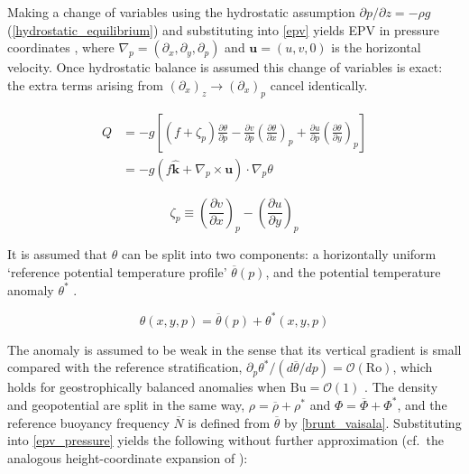 \documentclass{article}
\begin{document}
Making a change of variables using the hydrostatic assumption $\partial p /\partial z = - \rho g$ (\cref{hydrostatic_equilibrium}) and substituting into \cref{epv} yields EPV in pressure coordinates \cite{Hoskins1985}, where $\nabla _p = (\partial_x, \partial_y, \partial_p)$ and $\bm{u} = (u, v, 0)$ is the horizontal velocity.
Once hydrostatic balance is assumed this change of variables is exact: the extra terms arising from $(\partial_x)_z \to (\partial_x)_p$ \cite{Vallis2017} cancel identically.

\begin{equation}\label{epv_pressure}
\begin{aligned}
    Q &= -g \left[ \left(f + \zeta_p\right)\frac{\partial \theta}{\partial p} - \frac{\partial v}{\partial p} \left(\frac{\partial \theta}{\partial x}\right)_p + \frac{\partial u}{\partial p} \left(\frac{\partial \theta}{\partial y}\right)_p\right] \\
    &= -g (f \bm{\hat k} + \nabla_p \times \bm{u} ) \cdot \nabla_p \theta
\end{aligned}
\end{equation}

\begin{equation}\label{zeta_p}
    \zeta_p \equiv\left(\frac{\partial v}{\partial x}\right)_p - \left(\frac{\partial u}{\partial y}\right)_p
\end{equation}

It is assumed that $\theta$ can be split into two components: a horizontally uniform `reference potential temperature profile' $\overline \theta(p)$, and the potential temperature anomaly $\theta^*$ \cite{Hoskins1985,HOLTON_chapter6}.

\begin{equation}
    \theta(x,y,p) = \overline \theta (p) + \theta^* (x,y,p)
\end{equation}

The anomaly is assumed to be weak in the sense that its vertical gradient is small compared with the reference stratification, $\partial_p \theta^* / (d\overline\theta/dp) = \mathcal{O}(\mathrm{Ro})$, which holds for geostrophically balanced anomalies when $\mathrm{Bu} = \mathcal{O}(1)$ \cite{Vallis2017}.
The density and geopotential are split in the same way, $\rho = \overline\rho + \rho^*$ and $\Phi = \overline\Phi + \Phi^*$, and the reference buoyancy frequency $\overline N$ is defined from $\overline\theta$ by \cref{brunt_vaisala}.
Substituting into \cref{epv_pressure} yields the following without further approximation (cf.\ the analogous height-coordinate expansion of \cite{Vallis2017}):
\end{document}
